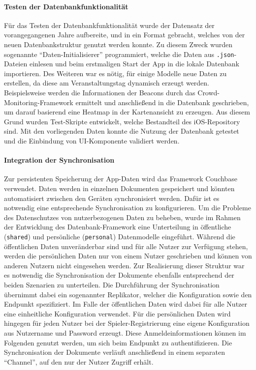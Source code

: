 \paragraph{Testen der Datenbankfunktionalität} Für das Testen der Datenbankfunktionalität wurde der Datensatz der vorangegangenen Jahre aufbereite, und in ein Format gebracht, welches von der neuen Datenbankstruktur genutzt werden konnte. Zu diesem Zweck wurden sogenannte \enquote{Daten-Initialisierer} programmiert, welche die Daten aus \texttt{.json}-Dateien einlesen und beim erstmaligen Start der App in die lokale Datenbank importieren. Des Weiteren war es nötig, für einige Modelle neue Daten zu erstellen, da diese am Veranstaltungstag dynamisch erzeugt werden. Beispielsweise werden die Informationen der Beacons durch das Crowd-Monitoring-Framework ermittelt und anschließend in die Datenbank geschrieben, um darauf basierend eine Heatmap in der Kartenansicht zu erzeugen. Aus diesem Grund wurden Test-Skripte entwickelt, welche Bestandteil des iOS-Repository sind. Mit den vorliegenden Daten konnte die Nutzung der Datenbank getestet und die Einbindung von UI-Komponente validiert werden. 

\paragraph{Integration der Synchronisation} Zur persistenten Speicherung der App-Daten wird das Framework Couchbase verwendet. Daten werden in einzelnen Dokumenten gespeichert und könnten automatisiert zwischen den Geräten synchronisiert werden. Dafür ist es notwendig eine entsprechende Synchronisation zu konfigurieren. Um die Probleme des Datenschutzes von nutzerbezogenen Daten zu beheben, wurde im Rahmen der Entwicklung des Datenbank-Framework eine Unterteilung in öffentliche (\texttt{shared}) und persönliche (\texttt{personal}) Datenmodelle eingeführt. Während die öffentlichen Daten unveränderbar sind und für alle Nutzer zur Verfügung stehen, werden die persönlichen Daten nur von einem Nutzer geschrieben und können von anderen Nutzern nicht eingesehen werden. Zur Realisierung dieser Struktur war es notwendig die Synchronisation der Dokumente ebenfalls entsprechend der beiden Szenarien zu unterteilen. Die Durchführung der Synchronisation übernimmt dabei ein sogenannter Replikator, welcher die Konfiguration sowie den Endpunkt spezifiziert. Im Falle der öffentlichen Daten wird dabei für alle Nutzer eine einheitliche Konfiguration verwendet. Für die persönlichen Daten wird hingegen für jeden Nutzer bei der Spieler-Registrierung eine eigene Konfiguration aus Nutzername und Password erzeugt. Diese Anmeldeinformationen können im Folgenden genutzt werden, um sich beim Endpunkt zu authentifizieren. Die Synchronisation der Dokumente verläuft anschließend in einem separaten \enquote{Channel}, auf den nur der Nutzer Zugriff erhält. 


